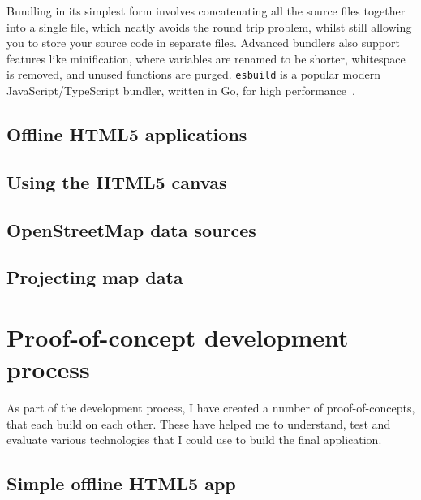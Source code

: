 \documentclass{final_report}
\begin{document}
Bundling in its simplest form involves concatenating all the source files together into a single file, which neatly avoids the round trip problem, whilst still allowing you to store your source code in separate files. Advanced bundlers also support features like minification, where variables are renamed to be shorter, whitespace is removed, and unused functions are purged. \texttt{esbuild} is a popular modern JavaScript/TypeScript bundler, written in Go, for high performance~\cite{esbuild}.

\section{Offline HTML5 applications}\label{sec:offline-html-applications}



\section{Using the HTML5 canvas}



\section{OpenStreetMap data sources}\label{sec:osm-data-sources}



\section{Projecting map data}\label{sec:projecting-map-data}



\clearpage
\chapter{Proof-of-concept development process}

As part of the development process, I have created a number of proof-of-concepts, that each build on each other. These have helped me to understand, test and evaluate various technologies that I could use to build the final application.

\section{Simple offline HTML5 app}
\end{document}

